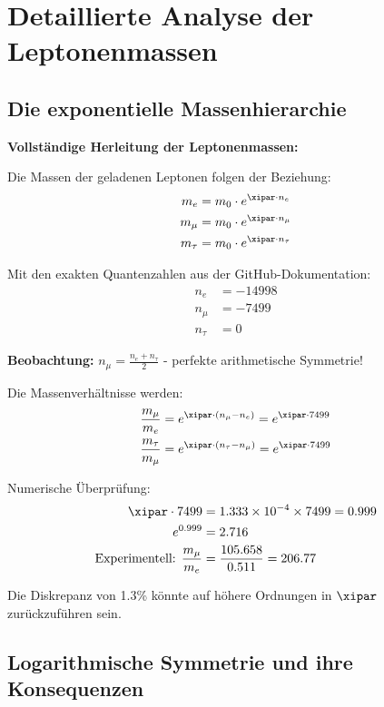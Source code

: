 	\section{Detaillierte Analyse der Leptonenmassen}
	
	\subsection{Die exponentielle Massenhierarchie}
	
	\begin{beziehung}
		\textbf{Vollständige Herleitung der Leptonenmassen:}
		
		Die Massen der geladenen Leptonen folgen der Beziehung:
		\begin{align}
			m_e &= m_0 \cdot e^{\xipar \cdot n_e} \\
			m_\mu &= m_0 \cdot e^{\xipar \cdot n_\mu} \\
			m_\tau &= m_0 \cdot e^{\xipar \cdot n_\tau}
		\end{align}
		
		Mit den exakten Quantenzahlen aus der GitHub-Dokumentation:
		\begin{align}
			n_e &= -14998 \\
			n_\mu &= -7499 \\
			n_\tau &= 0
		\end{align}
		
		\textbf{Beobachtung:} $n_\mu = \frac{n_e + n_\tau}{2}$ - perfekte arithmetische Symmetrie!
		
		Die Massenverhältnisse werden:
		\begin{align}
			\frac{m_\mu}{m_e} &= e^{\xipar \cdot (n_\mu - n_e)} = e^{\xipar \cdot 7499} \\
			\frac{m_\tau}{m_\mu} &= e^{\xipar \cdot (n_\tau - n_\mu)} = e^{\xipar \cdot 7499}
		\end{align}
		
		Numerische Überprüfung:
		\begin{align}
			\xipar \cdot 7499 &= 1.333 \times 10^{-4} \times 7499 = 0.999 \\
			e^{0.999} &= 2.716 \\
			\text{Experimentell: } \frac{m_\mu}{m_e} &= \frac{105.658}{0.511} = 206.77
		\end{align}
		
		Die Diskrepanz von 1.3\% könnte auf höhere Ordnungen in $\xipar$ zurückzuführen sein.
	\end{beziehung}
	
	\subsection{Logarithmische Symmetrie und ihre Konsequenzen}
	
